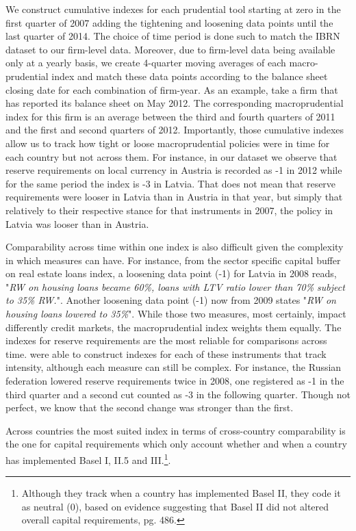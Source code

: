 \documentclass[12pt]{article}
\begin{document}
     We construct cumulative indexes for each prudential tool starting at zero in the first quarter of 2007 adding the tightening and loosening data points until the last quarter of 2014. The choice of time period is done such to match the IBRN dataset to our firm-level data. Moreover, due to firm-level data being available only at a yearly basis, we create 4-quarter moving averages of each macro-prudential index and match these data points according to the balance sheet closing date for each combination of firm-year. As an example, take a firm that has reported its balance sheet on May 2012. The corresponding macroprudential index for this firm is an average between the third and fourth quarters of 2011 and the first and second quarters of 2012. Importantly, those cumulative indexes allow us to track how tight or loose macroprudential policies were in time for each country but not across them. For instance, in our dataset we observe that reserve requirements on local currency in Austria is recorded as -1 in 2012 while for the same period the index is -3 in Latvia. That does not mean that reserve requirements were looser in Latvia than in Austria in that year, but simply that relatively to their respective stance for that instruments in 2007, the policy in Latvia was looser than in Austria. 
	  
	  Comparability across time within one index is also difficult given the complexity in which measures can have. For instance, from the 
	  sector specific capital buffer on real estate loans index, a loosening data point (-1) for Latvia in 2008 reads, "\textit{RW on housing loans became 60\%, loans with LTV ratio lower than 70\% subject to 35\% RW.}". Another loosening data point (-1) now from 2009 states "\textit{RW on housing loans lowered to 35\%}". While those two measures, most certainly, impact differently credit markets, the macroprudential index weights them equally. The indexes for reserve requirements are the most reliable for comparisons across time. \cite{cerutti2017changes} were able to construct indexes for each of these instruments that track intensity, although each measure can still be complex. For instance, the Russian federation lowered reserve requirements twice in 2008, one registered as -1 in the third quarter and a second cut counted as -3 in the following quarter. Though not perfect, we know that the second change was stronger than the first.  
	  
	  Across countries the most suited index in terms of cross-country comparability is the one for capital requirements which only account whether and when a country has implemented Basel I, II.5 and III.\footnote{Although they track when a country has implemented Basel II, they code it as neutral (0), based on evidence suggesting that Basel II did not altered overall capital requirements, \cite{cerutti2017changes} pg. 486.}.
	   
\end{document}
